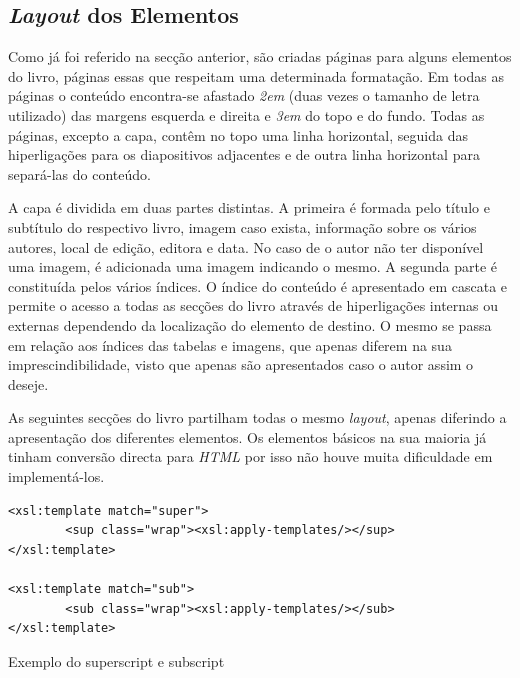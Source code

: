 \documentclass[a4paper]{article}
\begin{document}
\subsection{\large \emph{Layout} dos Elementos}

\hspace{1cm}Como já foi referido na secção anterior, são criadas páginas para alguns elementos do livro, páginas essas que respeitam uma determinada formatação.
Em todas as páginas o conteúdo encontra-se afastado \emph{2em} (duas vezes o tamanho de letra utilizado) das margens esquerda e direita e \emph{3em} do topo e do fundo.
Todas as páginas, excepto a capa, contêm no topo uma linha horizontal, seguida das hiperligações para os diapositivos adjacentes e de outra linha horizontal para
separá-las do conteúdo.

\hspace{1cm}A capa é dividida em duas partes distintas. A primeira é formada pelo título e subtítulo do respectivo livro, imagem caso exista, informação sobre os vários autores, local de edição, editora e data. No caso de o autor não ter disponível uma imagem, é adicionada uma imagem indicando o mesmo. A segunda parte é constituída pelos vários índices. O índice do conteúdo é apresentado em cascata e permite o acesso a todas as secções do livro através de hiperligações internas ou externas dependendo da localização do elemento de destino. O mesmo se passa em relação aos índices das tabelas e imagens, que apenas diferem na sua imprescindibilidade, visto que apenas são apresentados caso o autor assim o deseje.

\hspace{1cm}As seguintes secções do livro partilham todas o mesmo \emph{layout}, apenas diferindo a apresentação dos diferentes elementos. Os elementos básicos na sua maioria já tinham conversão directa para \emph{HTML} por isso não houve muita dificuldade em implementá-los.\\

\begin{small}
\begin{lstlisting}
<xsl:template match="super">
        <sup class="wrap"><xsl:apply-templates/></sup>
</xsl:template>
    
<xsl:template match="sub">
        <sub class="wrap"><xsl:apply-templates/></sub>
</xsl:template>
\end{lstlisting}
\end{small}
\begin{footnotesize}
\begin{center}
\caption{Exemplo do superscript e subscript}
\end{center}
\end{footnotesize}
\end{document}
